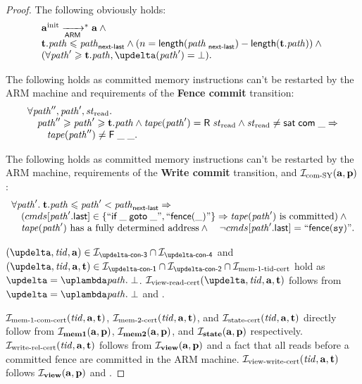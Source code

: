\begin{proof}
  The following obviously holds:
  \[\begin{array}{l}
    \ainit \armStepP^{*} \aT \land {} \\
    \tT.\cpath \le \cpath_{\textup{\sf next-last}} \land (n = \length(\cpath_{\textup{\sf next-last}}) - \length(\tT.\cpath)) \land {} \\
    (\forall \cpath' \ge \tT.\cpath, \delta(\cpath') = \bot). \\
  \end{array}\]

  The following holds as committed memory instructions can't be restarted by the ARM machine and requirements of
  the {\sf \bf Fence commit} transition:
  \[\begin{array}{l}
    \forall \cpath'', \cpath', \Rstate. \\
    \quad \cpath'' \ge \cpath' \ge \tT.\cpath \land \tape(\cpath') = \tapeRead{\Rstate} \land
       \Rstate \not = \tapeSatisfied{\Committed}{\_} \Rightarrow \\
    \qquad \tape(\cpath'') \not = \tapeFence{\_}{\_}. \\
  \end{array}\]

  The following holds as committed memory instructions can't be restarted by the ARM machine, requirements of
  the {\sf \bf Write commit} transition, and $\mathcal{I}_{\textup{\rm com-SY}}(\mathbf{a}, \mathbf{p})$:
  \[\begin{array}{l}
    \forall \cpath'. \; \tT.\cpath \le \cpath' < \cpath_{\textup{\sf next-last}} \Rightarrow \\
    \quad (\Cprom[\lastInstr{\cpath'}] \in \{``\ifGotoInst{\_}{\_}", ``\fenceInst{\_}"\} \Rightarrow
             \tape(\cpath') \text{ is committed}) \land {} \\
    \quad \tape(\cpath') \text{ has a fully determined address} \land
    \quad \lnot \Cprom[\lastInstr{\cpath'}] = ``\fenceInst{\SY}". \\
  \end{array}\]

  $(\delta, \tId, \aT) \in \invDeltaDefThree \cap \invDeltaDefFour$ and
  $(\delta, \tId, \aT, \tT) \in \invDeltaDefOne \cap \invDeltaDefTwo \cap \invMemZeroCERT$
  hold as $\delta = \lambda \cpath. \; \bot$.
  $\invViewReadCERT(\delta, \tId, \aT, \tT)$ follows from $\delta = \lambda \cpath. \; \bot$ and \app{\ref{thm:invAview}}.

  
  $\mathcal{I}_{\textup{\rm mem-1-com-cert}}(\mathit{tid}, \mathbf{a}, \mathbf{t})$, $\mathcal{I}_{\textup{\rm mem-2-cert}}(\mathit{tid}, \mathbf{a}, \mathbf{t})$, and $\mathcal{I}_{\textup{\rm state-cert}}(\mathit{tid}, \mathbf{a}, \mathbf{t})$
  directly follow from $\mathcal{I}_{\rm \bf mem1}(\mathbf{a}, \mathbf{p})$, $\mathcal{I}_{\rm \bf mem2}(\mathbf{a}, \mathbf{p})$, and $\mathcal{I}_{\rm \bf state}(\mathbf{a}, \mathbf{p})$ respectively.
  $\mathcal{I}_{\textup{\rm write-rel-cert}}(\mathit{tid}, \mathbf{a}, \mathbf{t})$ follows from $\mathcal{I}_{\rm \bf view}(\mathbf{a}, \mathbf{p})$ and a fact that all reads before a committed fence are committed
  in the ARM machine. $\mathcal{I}_{\textup{\rm view-write-cert}}(\mathit{tid}, \mathbf{a}, \mathbf{t})$ follows $\mathcal{I}_{\rm \bf view}(\mathbf{a}, \mathbf{p})$ and \app{\ref{thm:invAview}}.
\end{proof}





